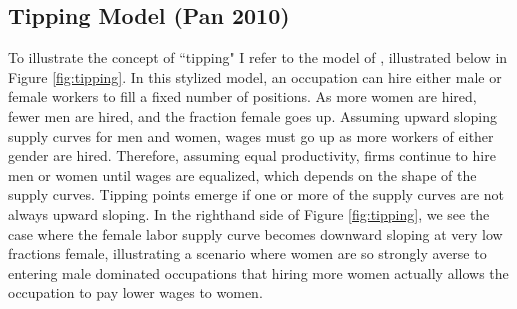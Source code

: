 \documentclass[12pt]{article}
\begin{document}






\clearpage 
\newpage
\subsection{Tipping Model (Pan 2010)}\label{sec.Pan}
To illustrate the concept of ``tipping" I refer to the model of , illustrated below in Figure \ref{fig:tipping}. In this stylized model, an occupation can hire either male or female workers to fill a fixed number of positions. As more women are hired, fewer men are hired, and the fraction female goes up. Assuming upward sloping supply curves for men and women, wages must go up as more workers of either gender are hired. Therefore, assuming equal productivity, firms continue to hire men or women until wages are equalized, which depends on the shape of the supply curves. Tipping points emerge if one or more of the supply curves are not always upward sloping. In the righthand side of Figure \ref{fig:tipping}, we see the case where the female labor supply curve becomes downward sloping at very low fractions female, illustrating a scenario where women are so strongly averse to entering male dominated occupations that hiring more women actually allows the occupation to pay lower wages to women.

\end{document}
